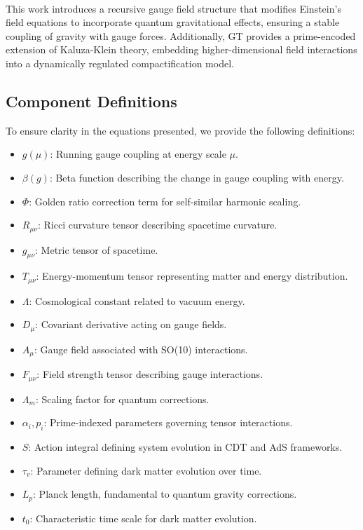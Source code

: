 \documentclass[12]{amsart}
\theoremstyle{plain}
\begin{document}
\paragraph{}This work introduces a recursive gauge field structure that modifies Einstein’s field equations to incorporate quantum gravitational effects, ensuring a stable coupling of gravity with gauge forces. Additionally, GT provides a prime-encoded extension of Kaluza-Klein theory, embedding higher-dimensional field interactions into a dynamically regulated compactification model.

\subsection{Component Definitions}
To ensure clarity in the equations presented, we provide the following definitions:

\begin{itemize}
    \item $g(\mu)$: Running gauge coupling at energy scale $\mu$.
    \item $\beta(g)$: Beta function describing the change in gauge coupling with energy.
    \item $\Phi$: Golden ratio correction term for self-similar harmonic scaling.
    \item $R_{\mu\nu}$: Ricci curvature tensor describing spacetime curvature.
    \item $g_{\mu\nu}$: Metric tensor of spacetime.
    \item $T_{\mu\nu}$: Energy-momentum tensor representing matter and energy distribution.
    \item $\Lambda$: Cosmological constant related to vacuum energy.
    \item $D_{\mu}$: Covariant derivative acting on gauge fields.
    \item $A_{\mu}$: Gauge field associated with SO(10) interactions.
    \item $F_{\mu\nu}$: Field strength tensor describing gauge interactions.
    \item $\Lambda_m$: Scaling factor for quantum corrections.
    \item $\alpha_i, p_i$: Prime-indexed parameters governing tensor interactions.
    \item $S$: Action integral defining system evolution in CDT and AdS frameworks.
    \item $\tau_v$: Parameter defining dark matter evolution over time.
    \item $L_p$: Planck length, fundamental to quantum gravity corrections.
    \item $t_0$: Characteristic time scale for dark matter evolution.
\end{itemize}
\end{document}
